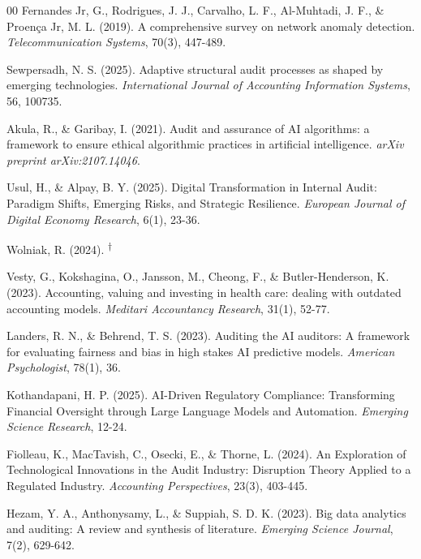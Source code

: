 \documentclass[conference]{IEEEtran}
\newcommand{\rvr}{\textsuperscript{$\dagger$}}
\begin{document}
\begin{thebibliography}{00}
 Fernandes Jr, G., Rodrigues, J. J., Carvalho, L. F., Al-Muhtadi, J. F., \& Proen\c{c}a Jr, M. L. (2019). A comprehensive survey on network anomaly detection. \emph{Telecommunication Systems}, 70(3), 447-489.

 Sewpersadh, N. S. (2025). Adaptive structural audit processes as shaped by emerging technologies. \emph{International Journal of Accounting Information Systems}, 56, 100735.

 Akula, R., \& Garibay, I. (2021). Audit and assurance of AI algorithms: a framework to ensure ethical algorithmic practices in artificial intelligence. \emph{arXiv preprint arXiv:2107.14046}.

 Usul, H., \& Alpay, B. Y. (2025). Digital Transformation in Internal Audit: Paradigm Shifts, Emerging Risks, and Strategic Resilience. \emph{European Journal of Digital Economy Research}, 6(1), 23-36.

 Wolniak, R. (2024). \rvr

 Vesty, G., Kokshagina, O., Jansson, M., Cheong, F., \& Butler-Henderson, K. (2023). Accounting, valuing and investing in health care: dealing with outdated accounting models. \emph{Meditari Accountancy Research}, 31(1), 52-77.

 Landers, R. N., \& Behrend, T. S. (2023). Auditing the AI auditors: A framework for evaluating fairness and bias in high stakes AI predictive models. \emph{American Psychologist}, 78(1), 36.

 Kothandapani, H. P. (2025). AI-Driven Regulatory Compliance: Transforming Financial Oversight through Large Language Models and Automation. \emph{Emerging Science Research}, 12-24.

 Fiolleau, K., MacTavish, C., Osecki, E., \& Thorne, L. (2024). An Exploration of Technological Innovations in the Audit Industry: Disruption Theory Applied to a Regulated Industry. \emph{Accounting Perspectives}, 23(3), 403-445.

 Hezam, Y. A., Anthonysamy, L., \& Suppiah, S. D. K. (2023). Big data analytics and auditing: A review and synthesis of literature. \emph{Emerging Science Journal}, 7(2), 629-642.


\end{thebibliography}
\end{document}
